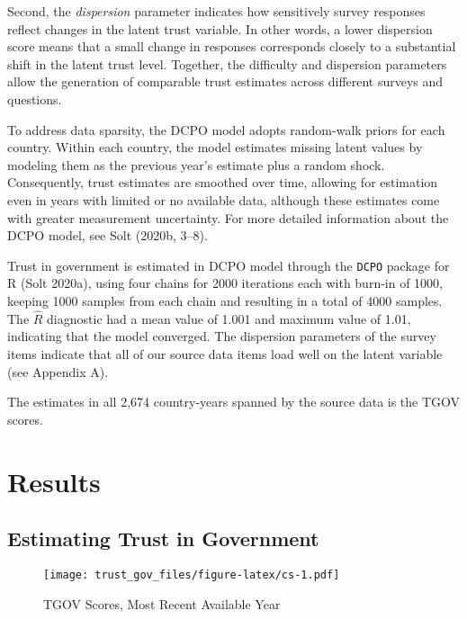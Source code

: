\documentclass[
  12pt,
]{article}
\begin{document}
Second, the \emph{dispersion} parameter indicates how sensitively survey responses reflect changes in the latent trust variable.
In other words, a lower dispersion score means that a small change in responses corresponds closely to a substantial shift in the latent trust level.
Together, the difficulty and dispersion parameters allow the generation of comparable trust estimates across different surveys and questions.

To address data sparsity, the DCPO model adopts random-walk priors for each country.
Within each country, the model estimates missing latent values by modeling them as the previous year's estimate plus a random shock.
Consequently, trust estimates are smoothed over time, allowing for estimation even in years with limited or no available data, although these estimates come with greater measurement uncertainty.
For more detailed information about the DCPO model, see Solt (2020b, 3--8).

Trust in government is estimated in DCPO model through the \texttt{DCPO} package for R (Solt 2020a), using four chains for 2000 iterations each with burn-in of 1000, keeping 1000 samples from each chain and resulting in a total of 4000 samples.
The \(\hat{R}\) diagnostic had a mean value of 1.001 and maximum value of 1.01, indicating that the model converged.
The dispersion parameters of the survey items indicate that all of our source data items load well on the latent variable (see Appendix A).

The estimates in all 2,674 country-years spanned by the source data is the TGOV scores.

\section{Results}\label{results}

\subsection{Estimating Trust in Government}\label{estimating-trust-in-government}

\begin{figure}
\centering
\texttt{[image: trust\_gov\_files/figure-latex/cs-1.pdf]}
\caption{\label{fig:cs}TGOV Scores, Most Recent Available Year \label{cs_mry}}
\end{figure}
\end{document}
